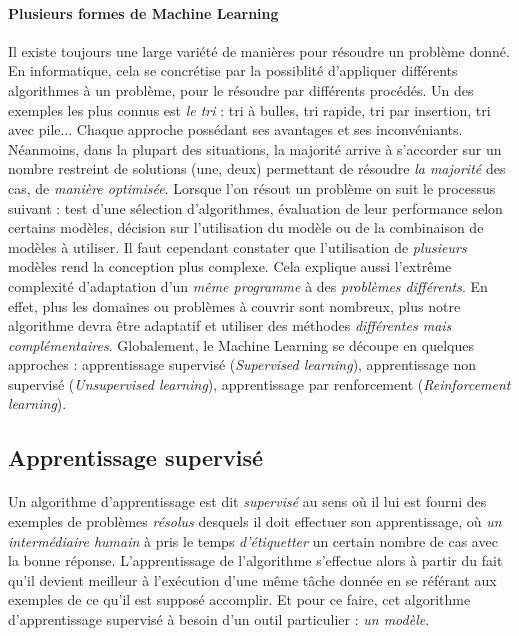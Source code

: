 \paragraph{Plusieurs formes de Machine Learning} Il existe toujours une large variété de manières pour résoudre un problème donné. En informatique, cela se concrétise par la possiblité
d'appliquer différents algorithmes à un problème, pour le résoudre par différents procédés. Un des exemples les plus connus est \emph{le tri} : tri à
bulles, tri rapide, tri par insertion, tri avec pile... Chaque approche possédant ses avantages et ses inconvéniants. Néanmoins, dans la plupart des
situations, la majorité arrive à s'accorder sur un nombre restreint de solutions (une, deux) permettant de résoudre \emph{la majorité} des cas, de \emph{manière optimisée}.
Lorsque l'on résout un problème on suit le processus suivant : test d'une sélection d'algorithmes, évaluation de leur performance selon certains
modèles, décision sur l'utilisation du modèle ou de la combinaison de modèles à utiliser. Il faut cependant constater que l'utilisation de \emph{plusieurs}
modèles rend la conception plus complexe. Cela explique aussi l'extrême complexité d'adaptation d'un \emph{même programme} à des \emph{problèmes différents}.
En effet, plus les domaines ou problèmes à couvrir sont nombreux, plus notre algorithme devra être adaptatif et utiliser des méthodes \emph{différentes mais complémentaires}. 
Globalement, le Machine Learning se découpe en quelques approches : apprentissage supervisé (\emph{Supervised learning}), apprentissage non supervisé
(\emph{Unsupervised learning}), apprentissage par renforcement (\emph{Reinforcement learning}).


\subsection*{Apprentissage supervisé}

\paragraph{} Un algorithme d'apprentissage est dit \emph{supervisé} au sens où il lui est fourni des exemples de problèmes \emph{résolus} desquels
il doit effectuer son apprentissage, où \emph{un intermédiaire humain} à pris le temps \emph{d'étiquetter} un certain nombre de cas avec la bonne réponse.
L'apprentissage de l'algorithme s'effectue alors à partir du fait qu'il devient meilleur à l'exécution d'une même tâche donnée en se référant aux exemples
de ce qu'il est supposé accomplir. Et pour ce faire, cet algorithme d'apprentissage supervisé à besoin d'un outil particulier : \emph{un modèle}.

